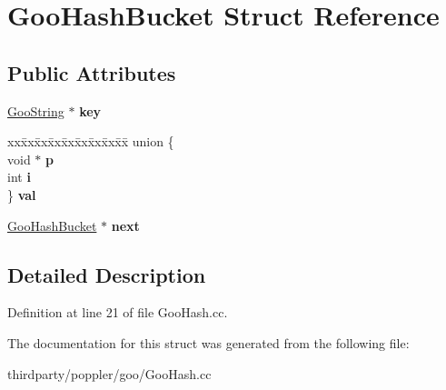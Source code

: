 \hypertarget{struct_goo_hash_bucket}{}\section{Goo\+Hash\+Bucket Struct Reference}
\label{struct_goo_hash_bucket}
\subsection*{Public Attributes}
\begin{DoxyCompactItemize}
\item 
\mbox{\label{struct_goo_hash_bucket_a36cde0bcf24b249f4aa9f5ed87697bad}} 
\hyperlink{class_goo_string}{Goo\+String} $\ast$ {\bfseries key}
\item 
\mbox{\label{struct_goo_hash_bucket_aaf34a38f6484b3d537c8a65e5653c569}} 
\begin{tabbing}
xx\=xx\=xx\=xx\=xx\=xx\=xx\=xx\=xx\=\kill
union \{\\
\>void $\ast$ {\bfseries p}\\
\>int {\bfseries i}\\
\} {\bfseries val}\\

\end{tabbing}\item 
\mbox{\label{struct_goo_hash_bucket_af959294b75f22307ba5c609d73e40e08}} 
\hyperlink{struct_goo_hash_bucket}{Goo\+Hash\+Bucket} $\ast$ {\bfseries next}
\end{DoxyCompactItemize}


\subsection{Detailed Description}


Definition at line 21 of file Goo\+Hash.\+cc.



The documentation for this struct was generated from the following file\+:\begin{DoxyCompactItemize}
\item 
thirdparty/poppler/goo/Goo\+Hash.\+cc\end{DoxyCompactItemize}
